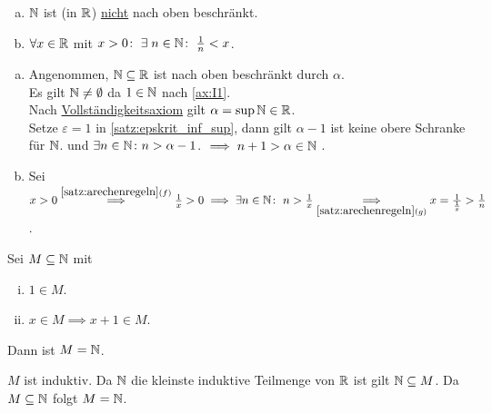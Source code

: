 \documentclass[../ana1.tex]{subfiles}
\begin{document}
\begin{satz}\label{satz:arch_prinz}\leavevmode
	\begin{enumerate}[(a)]
		\item \(\mathbb{N}\) ist (in \(\mathbb{R}\)) \underline{nicht} nach oben beschränkt.
		\item \(\forall x \in \mathbb{R}\) mit \(x > 0 \colon \; \exists \; n \in \mathbb{N} \colon \; \frac{1}{n} < x\).
	\end{enumerate}
\end{satz}
\begin{bew}\leavevmode
	\begin{enumerate}[(a)]
		\item Angenommen, \(\mathbb{N} \subseteq \mathbb{R}\) ist nach oben beschränkt durch \(\alpha\).\\
		      Es gilt \(\mathbb{N} \neq \emptyset\) da \(1 \in \mathbb{N}\) nach \autoref{ax:I1}.\\
		      Nach \hyperref[ax:V]{Vollständigkeitsaxiom} gilt \(\alpha = \sup \mathbb{N} \in \mathbb{R}\).\\
		      Setze \(\varepsilon = 1\) in \autoref{satz:epskrit_inf_sup}, dann gilt \(\alpha - 1\) ist keine obere Schranke für \(\mathbb{N}\).
		      und \(\exists n \in \mathbb{N} \colon n > \alpha - 1\).
			  \(\implies n+1 > \alpha \in \mathbb{N}\) \Lightning.
		\item Sei \(x > 0 \overset{\autoref{satz:arechenregeln}{(f)}}{\implies} \frac{1}{x} > 0 \implies \exists n \in \N \colon \; n > \frac{1}{x}\\
		      \underset{\autoref{satz:arechenregeln}{(g)}}{\implies} x = \frac{1}{\frac{1}{x}} > \frac{1}{n}\).\qedhere
	\end{enumerate}
\end{bew}

\begin{satz}[Induktionsprinzip]\label{satz:ind_prinz}
	Sei \(M \subseteq \mathbb{N}\) mit
	\begin{enumerate}[(i)]
		\item \(1\in M\).
		\item \(x \in M \implies x + 1 \in M\).
	\end{enumerate}
	Dann ist \(M = \mathbb{N}\).
\end{satz}
\begin{bew}
	\(M\) ist induktiv. Da \(\mathbb{N}\) die kleinste induktive Teilmenge von \(\mathbb{R}\) ist gilt \(\mathbb{N} \subseteq M\).
	Da \(M \subseteq \mathbb{N}\) folgt \(M = \mathbb{N}\).
\end{bew}
\end{document}
